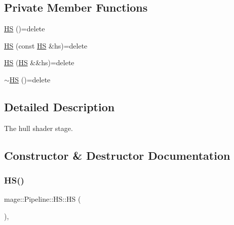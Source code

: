 \subsection*{Private Member Functions}
\begin{DoxyCompactItemize}
\item 
\hyperlink{structmage_1_1_pipeline_1_1_h_s_ad14106135ba68cfecdda687391b28c09}{HS} ()=delete
\item 
\hyperlink{structmage_1_1_pipeline_1_1_h_s_a75aba4984f00bb10ca3c9dcaa2ddf736}{HS} (const \hyperlink{structmage_1_1_pipeline_1_1_h_s}{HS} \&hs)=delete
\item 
\hyperlink{structmage_1_1_pipeline_1_1_h_s_a5d15cfdd0c70c220f86f989deeb6ef63}{HS} (\hyperlink{structmage_1_1_pipeline_1_1_h_s}{HS} \&\&hs)=delete
\item 
\hyperlink{structmage_1_1_pipeline_1_1_h_s_a4e2f5139e90bf07c8cb1b31d1e5876fc}{$\sim$\+HS} ()=delete
\end{DoxyCompactItemize}


\subsection{Detailed Description}
The hull shader stage. 

\subsection{Constructor \& Destructor Documentation}
\hypertarget{structmage_1_1_pipeline_1_1_h_s_ad14106135ba68cfecdda687391b28c09}{}\label{structmage_1_1_pipeline_1_1_h_s_ad14106135ba68cfecdda687391b28c09} 
\subsubsection{\texorpdfstring{H\+S()}{HS()}\hspace{0.1cm}{\footnotesize\ttfamily [1/3]}}
{\footnotesize\ttfamily mage\+::\+Pipeline\+::\+H\+S\+::\+HS (\begin{DoxyParamCaption}{ }\end{DoxyParamCaption})\hspace{0.3cm}{\ttfamily [private]}, {\ttfamily [delete]}}

\hypertarget{structmage_1_1_pipeline_1_1_h_s_a75aba4984f00bb10ca3c9dcaa2ddf736}{}\label{structmage_1_1_pipeline_1_1_h_s_a75aba4984f00bb10ca3c9dcaa2ddf736} 
